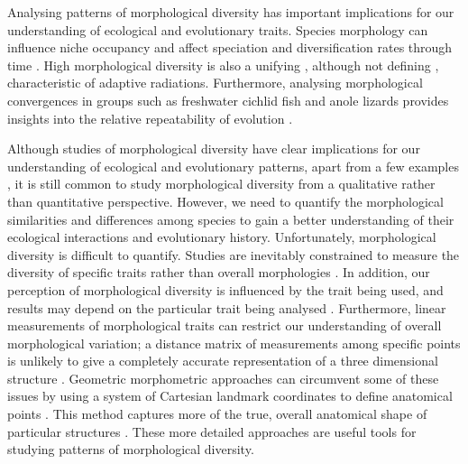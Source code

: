 \documentclass[12pt,a4paper]{article}
\begin{document}
	Analysing patterns of morphological diversity has important implications for our understanding of ecological and evolutionary traits. Species morphology can influence niche occupancy and affect speciation and diversification rates through time \citep{Price2012}. High morphological diversity is also a unifying \citep{Losos2010a, Olson2009}, although not defining \citep{Glor2010, Olson2009}, characteristic of adaptive radiations. Furthermore, analysing morphological convergences in groups such as freshwater cichlid fish \citep{Muschick2012} and anole lizards \citep{Mahler2013} provides insights into the relative repeatability of evolution \citep{Losos2011}.

	Although studies of morphological diversity have clear implications for our understanding of ecological and evolutionary patterns, apart from a few examples \citep[e.g.][]{Ruta2013, Goswami2011, Brusatte2008}, it is still common to study morphological diversity from a qualitative rather than quantitative perspective. However, we need to quantify the morphological similarities and differences among species to gain a better understanding of their ecological interactions and evolutionary history. Unfortunately, morphological diversity is difficult to quantify. Studies are inevitably constrained to measure the diversity of specific traits rather than overall morphologies \citep{Roy1997}. In addition, our perception of morphological diversity is influenced by the trait being used, and results may depend on the particular trait being analysed \citep{Foth2012}. Furthermore, linear measurements of morphological traits can restrict our understanding of overall morphological variation; a distance matrix of measurements among specific points is unlikely to give a completely accurate representation of a three dimensional structure \citep{Rohlf1993}. Geometric morphometric approaches can circumvent some of these issues by using a system of Cartesian landmark coordinates to define anatomical points \citep{Adams2004}. This method captures more of the true, overall anatomical shape of particular structures \citep{Mitteroecker2009}. These more detailed approaches are useful tools for studying patterns of morphological diversity.
	
\end{document}
